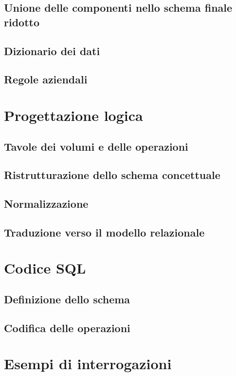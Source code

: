 \documentclass[a4paper,11pt]{article}
\begin{document}
\subsection{Unione delle componenti nello schema finale ridotto}

\subsection{Dizionario dei dati}

\subsection{Regole aziendali}

\section{Progettazione logica}

\subsection{Tavole dei volumi e delle operazioni}

\subsection{Ristrutturazione dello schema concettuale}

\subsection{Normalizzazione}

\subsection{Traduzione verso il modello relazionale}

\section{Codice SQL}

\subsection{Definizione dello schema}

\subsection{Codifica delle operazioni}

\section{Esempi di interrogazioni}
\end{document}
